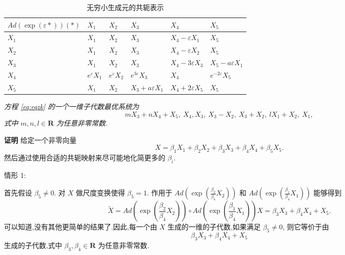 \begin{table}[!h]
\centering
\caption{{无穷小生成元的共轭表示}}
\label{tab:table1}
\begin{tabularx}{\linewidth}{XXXXXX}
\toprule[1.5pt]
$Ad(\exp(\varepsilon *))(*)$&$X_{1}$&$X_{2}$&$X_{3}$&$X_{4}$&$X_{5}$\\
\midrule[1pt]
$X_{1}$&$X_{1}$&$X_{2}$&$X_{3}$&$X_{4}-\varepsilon X_{1}$&$X_{5}$\\
$X_{2}$&$X_{1}$&$X_{2}$&$X_{3}$&$X_{4}-\varepsilon X_{2}$&$X_{5}$\\
$X_{3}$&$X_{1}$&$X_{2}$&$X_{3}$&$X_{4}-3\varepsilon X_{3}$&$X_{5}-a\varepsilon X_{1}$\\
$X_{4}$&$e^{\varepsilon}X_{1}$&$e^{\varepsilon}X_{2}$&$e^{3\varepsilon}X_{3}$&$X_{4}$&$e^{-2\varepsilon}X_{5}$\\
$X_{5}$&$X_{1}$&$X_{2}$&$X_{3}+a\varepsilon X_{1}$&$X_{4}+2\varepsilon X_{5}$&$X_{5}$\\
\bottomrule[1.5pt]
\end{tabularx}
\end{table}

\begin{theorem}
\emph{方程 \eqref{eq:eqzk} 的一个一维子代数最优系统为
\begin{equation*}
	mX_{3}+nX_{4}+X_{5},~ X_{4}, X_{3},~ X_{3}-X_{2}, ~X_{3}+X_{2}, ~lX_{1}+X_{2}, ~X_{1},
\end{equation*}
式中 $m,n,l\in \mathbf{R}$ 为任意非零常数.}
\end{theorem}

{\textbf{证明}} 给定一个非零向量
\begin{equation*}
	X=\beta_{1}X_{1}+\beta_{2}X_{2}+\beta_{3}X_{3}+\beta_{4}X_{4}+\beta_{5}X_{5}.
\end{equation*}
然后通过使用合适的共轭映射来尽可能地化简更多的 $\beta_i$.

情形 1:

首先假设 $\beta_5\neq 0.$ 对 $X$ 做尺度变换使得 $\beta_5=1$. 作用于 $Ad(\exp{(\frac{\beta_2}{\beta_4} X_2)})$ 和 $Ad(\exp{(\frac{\beta_1}{\beta_4} X_1)})$ 能够得到
\begin{equation*}
	\widetilde{X}=Ad(\exp{(\frac{\beta_2}{\beta_4} X_2)})\circ Ad(\exp{(\frac{\beta_1}{\beta_4} X_1)}) X=\beta_{3}X_{3}+\beta_{4}X_{4}+X_{5}.
\end{equation*}
可以知道,没有其他更简单的结果了.因此,每一个由 $X$ 生成的一维的子代数,如果满足 $\beta_5\neq 0 $, 则它等价于由
\begin{equation*}
	\beta_{3}X_{3}+\beta_{4}X_{4}+X_{5}
\end{equation*}
生成的子代数,式中 $\beta_{3}, \beta_{4} \in \mathbf{R}$ 为任意非零常数.

